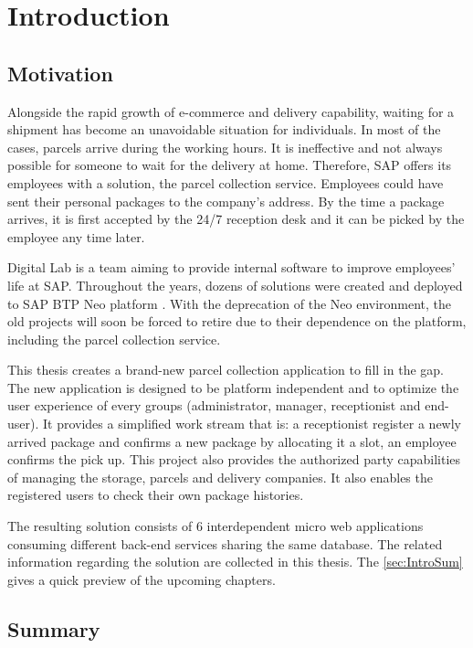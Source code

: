 \chapter{Introduction}
\label{ch:intro}

\section{Motivation}
Alongside the rapid growth of e-commerce and delivery capability, waiting for a shipment has become an unavoidable situation for individuals. In most of the cases, parcels arrive during the working hours. It is ineffective and not always possible for someone to wait for the delivery at home. Therefore, SAP \cite{sap} offers its employees with a solution, the parcel collection service. Employees could have sent their personal packages to the company's address. By the time a package arrives, it is first accepted by the 24/7 reception desk and it can be picked by the employee any time later.

Digital Lab is a team aiming to provide internal software to improve employees' life at SAP. Throughout the years, dozens of solutions were created and deployed to SAP BTP \cite{btp} Neo platform \cite{neo}. With the deprecation of the Neo environment, the old projects will soon be forced to retire due to their dependence on the platform, including the parcel collection service.

This thesis creates a brand-new parcel collection application to fill in the gap. The new application is designed to be platform independent and to optimize the user experience of every groups (administrator, manager, receptionist and end-user). It provides a simplified work stream that is: a receptionist register a newly arrived package and confirms a new package by allocating it a slot, an employee confirms the pick up. This project also provides the authorized party capabilities of managing the storage, parcels and delivery companies. It also enables the registered users to check their own package histories.

The resulting solution consists of 6 interdependent micro web applications consuming different back-end services sharing the same database. The related information regarding the solution are collected in this thesis. The \autoref{sec:IntroSum} gives a quick preview of the upcoming chapters.

\section{Summary}
\label{sec:IntroSum}

